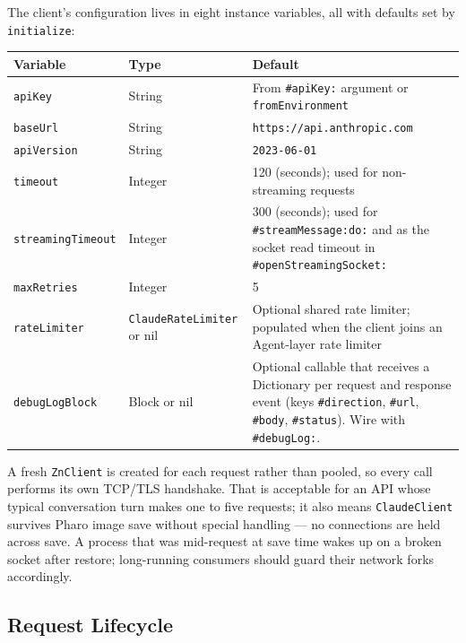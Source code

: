 \documentclass[a4paper,10pt,fleqn]{article}
\newcommand{\cls}[1]{\texttt{#1}}
\newcommand{\sel}[1]{\texttt{\##1}}
\begin{document}
The client's configuration lives in eight instance variables, all
with defaults set by \texttt{initialize}:

\begin{center}
\small
\begin{tabular}{@{}llp{5.5cm}@{}}
\toprule
\textbf{Variable} & \textbf{Type} & \textbf{Default} \\
\midrule
\texttt{apiKey}    & String   & From \sel{apiKey:} argument or \texttt{fromEnvironment} \\
\texttt{baseUrl}   & String   & \texttt{https://api.anthropic.com} \\
\texttt{apiVersion} & String  & \texttt{2023-06-01} \\
\texttt{timeout}   & Integer  & 120 (seconds); used for non-streaming requests \\
\texttt{streamingTimeout} & Integer & 300 (seconds); used for \sel{streamMessage:do:}
  and as the socket read timeout in \sel{openStreamingSocket:} \\
\texttt{maxRetries} & Integer & 5 \\
\texttt{rateLimiter} & \cls{ClaudeRateLimiter} or nil & Optional
  shared rate limiter; populated when the client joins an Agent-layer
  rate limiter \\
\texttt{debugLogBlock} & Block or nil & Optional callable that
  receives a Dictionary per request and response event (keys
  \texttt{\#direction}, \texttt{\#url}, \texttt{\#body},
  \texttt{\#status}). Wire with \sel{debugLog:}. \\
\bottomrule
\end{tabular}
\end{center}

A fresh \texttt{ZnClient} is created for each request rather than
pooled, so every call performs its own TCP/TLS handshake.  That
is acceptable for an API whose typical conversation turn makes
one to five requests; it also means \texttt{ClaudeClient} survives
Pharo image save without special handling --- no connections are
held across save.  A process that was mid-request at save time
wakes up on a broken socket after restore; long-running consumers
should guard their network forks accordingly.

\subsection{Request Lifecycle}
\label{sec:request-lifecycle}
\end{document}
